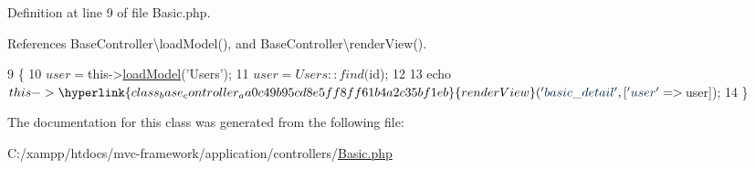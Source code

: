 Definition at line 9 of file Basic.\+php.



References Base\+Controller\textbackslash{}load\+Model(), and Base\+Controller\textbackslash{}render\+View().


\begin{DoxyCode}
9                                    \{
10         $user = $this->\hyperlink{class_base_controller_a5fa8890bd3a9d20f5c0cc2377dc49eb1}{loadModel}(\textcolor{stringliteral}{'Users'});
11         $user = Users::find($id);
12 
13         echo $this->\hyperlink{class_base_controller_aa0c49b95cd8e5ff8ff61b4a2c35bf1eb}{renderView}(\textcolor{stringliteral}{'basic\_detail'}, [\textcolor{stringliteral}{'user'} => $user]);
14     \}
\end{DoxyCode}


The documentation for this class was generated from the following file\+:\begin{DoxyCompactItemize}
\item 
C\+:/xampp/htdocs/mvc-\/framework/application/controllers/\hyperlink{controllers_2_basic_8php}{Basic.\+php}\end{DoxyCompactItemize}
